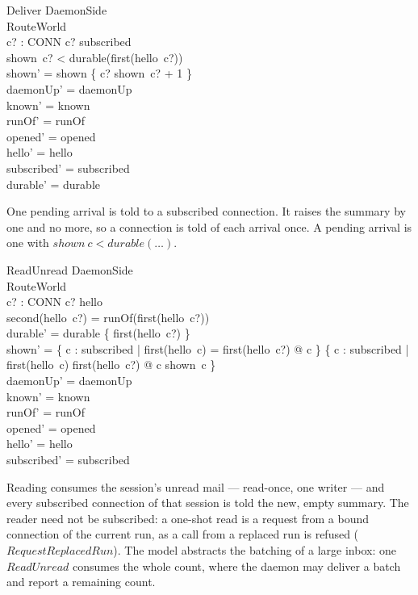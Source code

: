 \documentclass[a4paper,10pt,fleqn]{article}
\begin{document}
\begin{schema}{Deliver}
  \Delta DaemonSide \\
  \Xi RouteWorld \\
  c? : CONN
  \where
  c? \in subscribed \\
  shown~c? < durable(first(hello~c?)) \\
  shown' = shown \oplus \{ c? \mapsto shown~c? + 1 \} \\
  daemonUp' = daemonUp \\
  known' = known \\
  runOf' = runOf \\
  opened' = opened \\
  hello' = hello \\
  subscribed' = subscribed \\
  durable' = durable
\end{schema}

One pending arrival is told to a subscribed connection.  It raises the
summary by one and no more, so a connection is told of each arrival
once.  A pending arrival is one with $shown~c < durable(\ldots)$.

\begin{schema}{ReadUnread}
  \Delta DaemonSide \\
  \Xi RouteWorld \\
  c? : CONN
  \where
  c? \in \dom hello \\
  second(hello~c?) = runOf(first(hello~c?)) \\
  durable' = durable \oplus \{ first(hello~c?)  \} \\
  shown' =
    \{ c : subscribed | first(hello~c) = first(hello~c?) @ c  \}
    \cup
    \{ c : subscribed | first(hello~c) \neq first(hello~c?) @
        c \mapsto shown~c \} \\
  daemonUp' = daemonUp \\
  known' = known \\
  runOf' = runOf \\
  opened' = opened \\
  hello' = hello \\
  subscribed' = subscribed
\end{schema}

Reading consumes the session's unread mail --- read-once, one writer ---
and every subscribed connection of that session is told the new, empty
summary.  The reader need not be subscribed: a one-shot read is a request
from a bound connection of the current run, as a call from a replaced run
is refused ($RequestReplacedRun$).  The model abstracts the batching of a
large inbox: one $ReadUnread$ consumes the whole count, where the daemon may
deliver a batch and report a remaining count.
\end{document}
